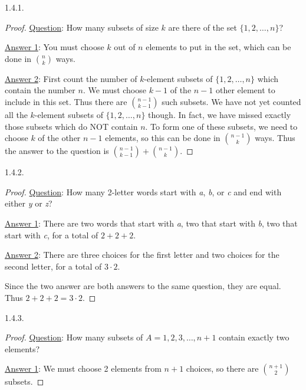  \protect {} \protect \begin {itemize} 
\begin{ans}{1.4.1.}
		\begin{proof}
			\underline{Question}: How many subsets of size $k$ are there of the set $\{1,2,\ldots, n\}$?

			\underline{Answer 1}: You must choose $k$ out of $n$ elements to put in the set, which can be done in ${n \choose k}$ ways.

			\underline{Answer 2}: First count the number of $k$-element subsets of $\{1,2,\ldots, n\}$ which contain the number $n$.  We must choose $k-1$ of the $n-1$ other element to include in this set.  Thus there are ${n-1\choose k-1}$ such subsets.  We have not yet counted all the $k$-element subsets of $\{1,2,\ldots, n\}$ though.  In fact, we have missed exactly those subsets which do NOT contain $n$.  To form one of these subsets, we need to choose $k$ of the other $n-1$ elements, so this can be done in ${n-1 \choose k}$ ways.    Thus the answer to the question is ${n-1 \choose k-1} + {n-1 \choose k}$.
		\end{proof}
	
\end{ans}
\begin{ans}{1.4.2.}
		\begin{proof}
		\underline{Question}: How many 2-letter words start with \textit{a}, \textit{b}, or \textit{c} and end with either \textit{y} or \textit{z}?

		\underline{Answer 1}: There are two words that start with \textit{a}, two that start with \textit{b}, two that start with \textit{c}, for a total of $2+2+2$.

		\underline{Answer 2}:  There are three choices for the first letter and two choices for the second letter, for a total of $3 \cdot 2$.

		Since the two answer are both answers to the same question, they are equal.  Thus $2 + 2 + 2 = 3\cdot 2$.
		\end{proof}
	
\end{ans}
\begin{ans}{1.4.3.}
	\begin{proof}
        \underline{Question}: How many subsets of $A = {1,2,3, \ldots, n+1}$ contain exactly two elements?

        \underline{Answer 1}: We must choose 2 elements from $n+1$ choices, so there are ${n+1 \choose 2}$ subsets.


\end{proof}
\end{ans}
\end{itemize}
